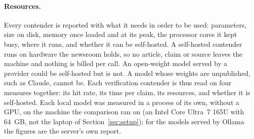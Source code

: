 \paragraph{Resources.} Every contender is reported with what it needs in
order to be used: parameters, size on disk, memory once loaded and at
its peak, the processor cores it kept busy, where it runs, and whether it
can be self-hosted. A self-hosted contender runs on hardware the newsroom
holds, so no article, claim or source leaves the machine and nothing is
billed per call. An open-weight model served by a provider could be
self-hosted but is not. A model whose weights are unpublished, such as
Claude, cannot be. Each verification contender is thus read on four measures
together: its hit rate, its time per claim, its resources, and whether it
is self-hosted. Each
local model was measured in a process of its own, without a GPU, on the
machine the comparison ran on (an Intel Core Ultra~7 165U with 64~GB,
not the laptop of Section~\ref{sec:setup}); for the models served by Ollama the figures are
the server's own report.
